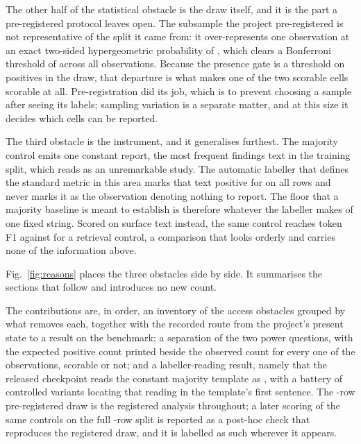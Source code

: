 The other half of the statistical obstacle is the draw itself, and it is the
part a pre-registered protocol leaves open. The subsample the project
pre-registered is not representative of the split it came from: it
over-represents one observation at an exact two-sided hypergeometric
probability of \SkewP{}, which clears a Bonferroni threshold of \Bonferroni{}
across all \NFindings{} observations. Because the presence gate is a threshold
on positives in the draw, that departure is what makes one of the two scorable
cells scorable at all. Pre-registration did its job, which is to prevent
choosing a sample after seeing its labels; sampling variation is a separate
matter, and at this size it decides which cells can be reported.

The third obstacle is the instrument, and it generalises furthest. The majority
control emits one constant report, the most frequent findings text in the
training split, which reads as an unremarkable study. The automatic labeller
that defines the standard metric in this area marks that text positive for
\MajAsserted{} on all \NCohort{} rows and never marks it as the observation
denoting nothing to report. The floor that a majority baseline is meant to
establish is therefore whatever the labeller makes of one fixed string. Scored
on surface text instead, the same control reaches \SurfaceMajorityF{} token F1
against \SurfaceRetrievalF{} for a retrieval control, a comparison that looks
orderly and carries none of the information above.

Fig.~\ref{fig:reasons} places the three obstacles side by side. It summarises
the sections that follow and introduces no new count.

The contributions are, in order, an inventory of the \NLocks{} access
obstacles grouped by what removes each, together with the recorded route from
the project's present state to a result on the benchmark; a separation of the
two power questions, with the expected positive count printed beside the
observed count for every one of the \NFindings{} observations, scorable or not;
and a labeller-reading result, namely that the released checkpoint reads the
constant majority template as \MajAsserted{}, with a battery of \BatteryN{}
controlled variants locating that reading in the template's first sentence.
The \NCohort{}-row pre-registered draw is the registered analysis throughout;
a later scoring of the same controls on the full \FullSplitN{}-row split is
reported as a post-hoc check that reproduces the registered draw, and it is
labelled as such wherever it appears.

